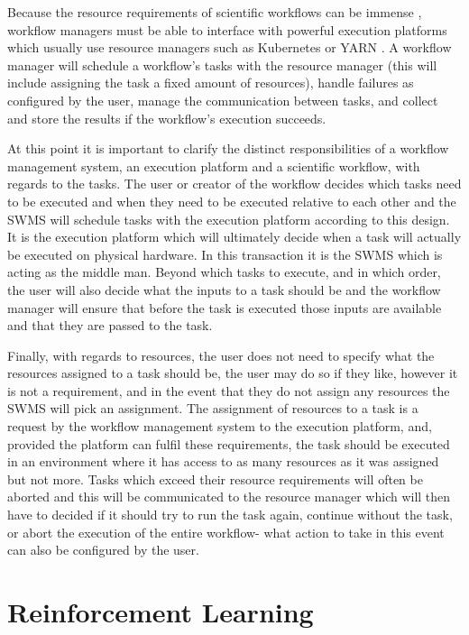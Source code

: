 Because the resource requirements of scientific workflows can be immense \cite{ResourceProvisioning}, workflow managers must be able to interface with powerful execution platforms which usually use resource managers such as Kubernetes \cite{kubernetes} or YARN \cite{yarn}. A workflow manager will schedule a workflow’s tasks with the resource manager (this will include assigning the task a fixed amount of resources), handle failures as configured by the user, manage the communication between tasks, and collect and store the results if the workflow’s execution succeeds.

At this point it is important to clarify the distinct responsibilities of a workflow management system, an execution platform and a scientific workflow, with regards to the tasks. The user or creator of the workflow decides which tasks need to be executed and when they need to be executed relative to each other and the SWMS will schedule tasks with the execution platform according to this design. It is the execution platform which will ultimately decide when a task will actually be executed on physical hardware. In this transaction it is the SWMS which is acting as the middle man. Beyond which tasks to execute, and in which order, the user will also decide what the inputs to a task should be and the workflow manager will ensure that before the task is executed those inputs are available and that they are passed to the task. 

Finally, with regards to resources, the user does not need to specify what the resources assigned to a task should be, the user may do so if they like, however it is not a requirement, and in the event that they do not assign any resources the SWMS will pick an assignment. The assignment of resources to a task is a request by the workflow management system to the execution platform, and, provided the platform can fulfil these requirements, the task should be executed in an environment where it has access to as many resources as it was assigned but not more. Tasks which exceed their resource requirements will often be aborted and this will be communicated to the resource manager which will then have to decided if it should try to run the task again, continue without the task, or abort the execution of the entire workflow- what action to take in this event can also be configured by the user.

\section{Reinforcement Learning}
\label{sec:rl}

